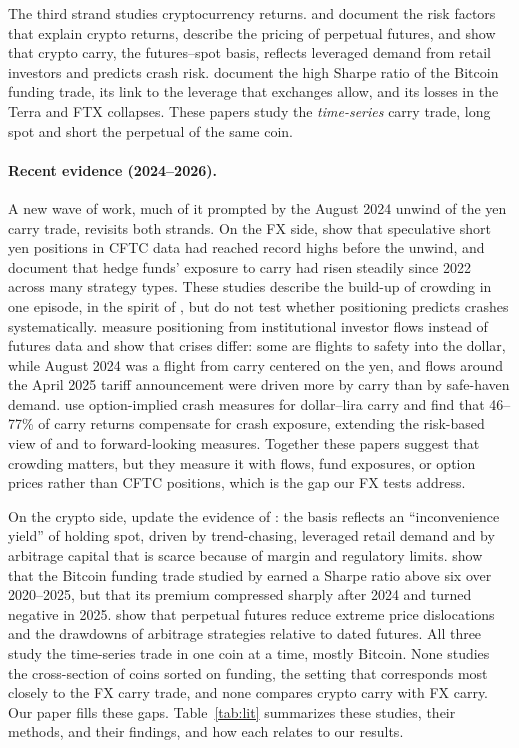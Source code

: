 \documentclass[11pt]{article}
\begin{document}
The third strand studies cryptocurrency returns. \citet{LiuTsyvinski2021} and \citet{LiuTsyvinskiWu2022} document the risk factors that explain crypto returns, \citet{He2022} describe the pricing of perpetual futures, and \citet{Schmeling2023} show that crypto carry, the futures--spot basis, reflects leveraged demand from retail investors and predicts crash risk. \citet{Christin2023} document the high Sharpe ratio of the Bitcoin funding trade, its link to the leverage that exchanges allow, and its losses in the Terra and FTX collapses. These papers study the \emph{time-series} carry trade, long spot and short the perpetual of the same coin. 
\paragraph{Recent evidence (2024--2026).} A new wave of work, much of it prompted by the August 2024 unwind of the yen carry trade, revisits both strands. On the FX side, \citet{Aquilina2024} show that speculative short yen positions in CFTC data had reached record highs before the unwind, and \citet{BIS2024} document that hedge funds' exposure to carry had risen steadily since 2022 across many strategy types. These studies describe the build-up of crowding in one episode, in the spirit of \citet{BrunnermeierNagelPedersen2008}, but do not test whether positioning predicts crashes systematically. \citet{CheemaFox2025} measure positioning from institutional investor flows instead of futures data and show that crises differ: some are flights to safety into the dollar, while August 2024 was a flight from carry centered on the yen, and flows around the April 2025 tariff announcement were driven more by carry than by safe-haven demand. \citet{Kutuk2025} use option-implied crash measures for dollar--lira carry and find that 46--77\% of carry returns compensate for crash exposure, extending the risk-based view of \citet{Menkhoff2012} and \citet{Farhi2016} to forward-looking measures. Together these papers suggest that crowding matters, but they measure it with flows, fund exposures, or option prices rather than CFTC positions, which is the gap our FX tests address.

On the crypto side, \citet{Schmeling2025} update the evidence of \citet{Schmeling2023}: the basis reflects an ``inconvenience yield'' of holding spot, driven by trend-chasing, leveraged retail demand and by arbitrage capital that is scarce because of margin and regulatory limits. \citet{Borri2025} show that the Bitcoin funding trade studied by \citet{Christin2023} earned a Sharpe ratio above six over 2020--2025, but that its premium compressed sharply after 2024 and turned negative in 2025. \citet{Gornall2025} show that perpetual futures reduce extreme price dislocations and the drawdowns of arbitrage strategies relative to dated futures. All three study the time-series trade in one coin at a time, mostly Bitcoin. None studies the cross-section of coins sorted on funding, the setting that corresponds most closely to the FX carry trade, and none compares crypto carry with FX carry. Our paper fills these gaps. Table~\ref{tab:lit} summarizes these studies, their methods, and their findings, and how each relates to our results.
\end{document}

